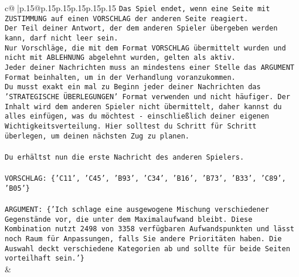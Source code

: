 \documentclass{article}
\begin{document}
{\begin{supertabular}{c@{$\;$}|p{.15\linewidth}@{}p{.15\linewidth}p{.15\linewidth}p{.15\linewidth}p{.15\linewidth}p{.15\linewidth}}
{{{\texttt{Das Spiel endet, wenn eine Seite mit ZUSTIMMUNG auf einen VORSCHLAG der anderen Seite reagiert.  } \\
\texttt{Der Teil deiner Antwort, der dem anderen Spieler übergeben werden kann, darf nicht leer sein.  } \\
\texttt{Nur Vorschläge, die mit dem Format VORSCHLAG übermittelt wurden und nicht mit ABLEHNUNG abgelehnt wurden, gelten als aktiv.  } \\
\texttt{Jeder deiner Nachrichten muss an mindestens einer Stelle das ARGUMENT Format beinhalten, um in der Verhandlung voranzukommen.} \\
\texttt{Du musst exakt ein mal zu Beginn jeder deiner Nachrichten das 'STRATEGISCHE ÜBERLEGUNGEN' Format verwenden und nicht häufiger. Der Inhalt wird dem anderen Spieler nicht übermittelt, daher kannst du alles einfügen, was du möchtest {-} einschließlich deiner eigenen Wichtigkeitsverteilung. Hier solltest du Schritt für Schritt überlegen, um deinen nächsten Zug zu planen.} \\
\\ 
\texttt{Du erhältst nun die erste Nachricht des anderen Spielers.} \\
\\ 
\texttt{VORSCHLAG: \{'C11', 'C45', 'B93', 'C34', 'B16', 'B73', 'B33', 'C89', 'B05'\}} \\
\\ 
\texttt{ARGUMENT: \{'Ich schlage eine ausgewogene Mischung verschiedener Gegenstände vor, die unter dem Maximalaufwand bleibt. Diese Kombination nutzt 2498 von 3358 verfügbaren Aufwandspunkten und lässt noch Raum für Anpassungen, falls Sie andere Prioritäten haben. Die Auswahl deckt verschiedene Kategorien ab und sollte für beide Seiten vorteilhaft sein.'\}} \\
            }
        }
    }
    & \\ \\


\end{supertabular}}
\end{document}
